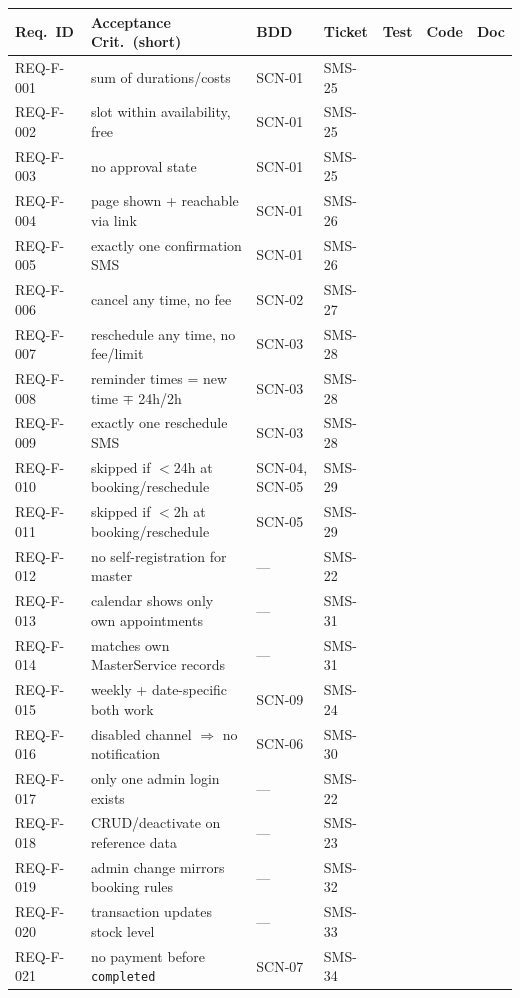 \documentclass[11pt,a4paper]{article}
\begin{document}
\begin{longtable}{L{1.7cm}L{2.3cm}L{1.6cm}L{1.4cm}L{1.4cm}L{1.4cm}L{1.4cm}}
\toprule
Req.\ ID & Acceptance Crit.\ (short) & BDD & Ticket & Test & Code & Doc \\
\midrule
\endhead

REQ-F-001 & sum of durations/costs & SCN-01 & SMS-25 & & &  \\
REQ-F-002 & slot within availability, free & SCN-01 & SMS-25 & & &  \\
REQ-F-003 & no approval state & SCN-01 & SMS-25 & & &  \\
REQ-F-004 & page shown + reachable via link & SCN-01 & SMS-26 & & &  \\
REQ-F-005 & exactly one confirmation SMS & SCN-01 & SMS-26 & & &  \\
REQ-F-006 & cancel any time, no fee & SCN-02 & SMS-27 & & &  \\
REQ-F-007 & reschedule any time, no fee/limit & SCN-03 & SMS-28 & & &  \\
REQ-F-008 & reminder times = new time $\mp$ 24h/2h & SCN-03 & SMS-28 & & &  \\
REQ-F-009 & exactly one reschedule SMS & SCN-03 & SMS-28 & & &  \\
REQ-F-010 & skipped if $<$24h at booking/reschedule & SCN-04, SCN-05 & SMS-29 & & &  \\
REQ-F-011 & skipped if $<$2h at booking/reschedule & SCN-05 & SMS-29 & & &  \\
REQ-F-012 & no self-registration for master & --- & SMS-22 & & &  \\
REQ-F-013 & calendar shows only own appointments & --- & SMS-31 & & &  \\
REQ-F-014 & matches own MasterService records & --- & SMS-31 & & &  \\
REQ-F-015 & weekly + date-specific both work & SCN-09 & SMS-24 & & &  \\
REQ-F-016 & disabled channel $\Rightarrow$ no notification & SCN-06 & SMS-30 & & &  \\
REQ-F-017 & only one admin login exists & --- & SMS-22 & & &  \\
REQ-F-018 & CRUD/deactivate on reference data & --- & SMS-23 & & &  \\
REQ-F-019 & admin change mirrors booking rules & --- & SMS-32 & & &  \\
REQ-F-020 & transaction updates stock level & --- & SMS-33 & & &  \\
REQ-F-021 & no payment before \texttt{completed} & SCN-07 & SMS-34 & & &  \\

\end{longtable}
\end{document}
